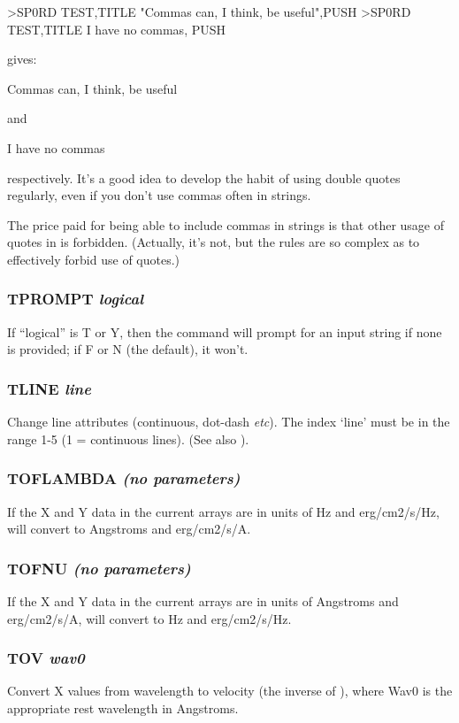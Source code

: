 \documentclass[twoside,11pt,noabs,nolof]{starlink}
\providecommand{\dipcom}[3]{\subsubsection*{\label{COM:#1}\textbf{#1} \emph{#2}}}
\begin{document}
\begin{terminalv}
>SP0RD TEST,TITLE "Commas can, I think, be useful",PUSH
>SP0RD TEST,TITLE I have no commas, PUSH
\end{terminalv}

gives:

\begin{terminalv}
Commas can, I think, be useful
\end{terminalv}

and

\begin{terminalv}
I have no commas
\end{terminalv}

respectively. It's a good idea to develop the habit of using double
quotes regularly, even if you don't use commas often in strings.

The price paid for being able to include commas in strings is that
other usage of quotes in   is forbidden. (Actually, it's not, but
the rules are so complex as to effectively forbid use of quotes.)

\dipcom{TPROMPT}{logical}{Determines if the {\texttt{TITLE}} command should prompt for a string}
If ``logical'' is T or Y, then the command   will prompt for an
input string if none is provided; if F or N (the default), it won't.

\dipcom{TLINE}{line}{Changes the style of all plotted lines}
Change line attributes (continuous, dot-dash \emph{etc}). The index `line'
must be in the range 1-5 (1 = continuous lines). (See also ).

\dipcom{TOFLAMBDA}{(no parameters)}{Converts data to Angstroms and erg/cm2/s/A}
If the X and Y data in the current arrays are in units of Hz and
\newline erg/cm2/s/Hz,   will convert to Angstroms and
erg/cm2/s/A.

\dipcom{TOFNU}{(no parameters)}{Converts data to Hz and erg/cm2/s/Hz}
If the X and Y data in the current arrays are in units of Angstroms
and erg/cm2/s/A,   will convert to Hz and erg/cm2/s/Hz.

\dipcom{TOV}{wav0}{Converts X values from wavelength to velocity}
Convert X values from wavelength to velocity (the inverse of ),
where Wav0 is the appropriate rest wavelength in Angstroms.
\end{document}
